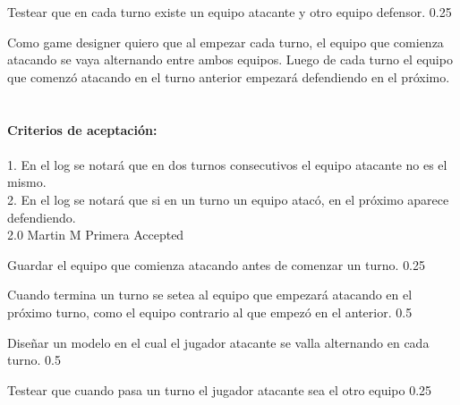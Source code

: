		{Testear que en cada turno existe un equipo atacante y otro equipo defensor.} %
		{} %
		{0.25} %
		{} %
		{} %
		{} %
\vspace{20pt}


	{Como game designer quiero que al empezar cada turno, el equipo que comienza atacando se vaya alternando entre ambos equipos.} %
	{Luego de cada turno el equipo que comenz\'o atacando en el turno anterior empezará defendiendo en el pr\'oximo.
\\
  \\
  \\
\textbf{Criterios de aceptación:}\\
  \\
1. En el log se notar\'a que en dos turnos consecutivos el equipo atacante no es el mismo. \\
2. En el log se notará que si en un turno un equipo atac\'o, en el pr\'oximo aparece defendiendo. \\
} %
	{} %
	{2.0} %
	{Martin M} %
	{Primera} %
	{Accepted} %

		{Guardar el equipo que comienza atacando antes de comenzar un turno.} %
		{} %
		{0.25} %
		{} %
		{} %
		{} %

		{Cuando termina un turno se setea al equipo que empezar\'a atacando en el pr\'oximo turno, como el equipo contrario al que empez\'o en el anterior.} %
		{} %
		{0.5} %
		{} %
		{} %
		{} %

		{Diseñar un modelo en el cual el jugador atacante se valla alternando en cada turno.} %
		{} %
		{0.5} %
		{} %
		{} %
		{} %

		{Testear que cuando pasa un turno el jugador atacante sea el otro equipo} %
		{} %
		{0.25} %
		{} %
		{} %
		{} %

